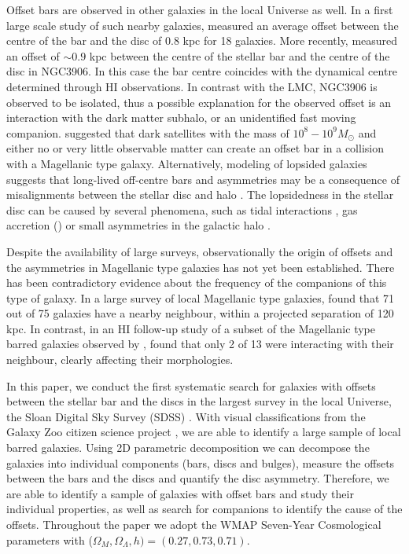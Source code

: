 \documentclass[a4paper,fleqn,usenatbib,useAMS]{mnras}
\begin{document}
Offset bars are observed in other galaxies in the local Universe as well. In a first large scale study of such nearby galaxies, \citet{Feitzinger1980} measured an average offset between the centre of the bar and the disc of $0.8$ kpc for 18 galaxies. More recently, \citet{Swardt2015} measured an offset of $\sim$$0.9$ kpc between the centre of the stellar bar and the centre of the disc in NGC3906. In this case the bar centre coincides with the dynamical centre determined through HI observations. In contrast with the LMC, NGC3906 is observed to be isolated, thus a possible explanation for the observed offset is an interaction with the dark matter subhalo, or an unidentified fast moving companion.  \citet{Bekki2009} suggested that dark satellites with the mass of $10^{8}-10^{9} M_{\odot}$ and either no or very little observable matter can create an offset bar in a collision with a Magellanic type galaxy. Alternatively, modeling of lopsided galaxies suggests that long-lived off-centre bars and asymmetries may be a consequence of misalignments between the stellar disc and halo \citep{Jog1997,levine1998,Noordermeer2001}. The lopsidedness in the stellar disc can be caused by several phenomena, such as tidal interactions \citep{Bale1969}, gas accretion (\citet{Zaritsky1997, Bournaud2005}) or small asymmetries in the galactic halo \citep{Jog2009}.

Despite the availability of large surveys, observationally the origin of offsets and the asymmetries in Magellanic type galaxies has not yet been established. There has been contradictory evidence about the frequency of the companions of this type of galaxy. In a large survey of local Magellanic type galaxies, \citet{Odewahn1994} found that 71 out of 75 galaxies have a nearby neighbour, within a projected separation of 120 kpc. In contrast, in an HI follow-up study of a subset of the Magellanic type barred galaxies observed by \citet{Odewahn1994}, \citet{Wilcots2004} found that only 2 of 13  were interacting with their neighbour, clearly affecting their morphologies.

In this paper, we conduct the first systematic search for galaxies with offsets between the stellar bar and the discs in the largest survey in the local Universe, the Sloan Digital Sky Survey (SDSS) \citep{York2000}. With visual classifications from the Galaxy Zoo citizen science project \citep{Lintott2008, Willett2013}, we are able to identify a large sample of local barred galaxies. Using 2D parametric decomposition we can decompose the galaxies into individual components (bars, discs and bulges), measure the offsets between the bars and the discs and quantify the disc asymmetry. Therefore, we are able to identify a sample of galaxies with offset bars and study their individual properties, as well as search for companions to identify the cause of the offsets. Throughout the paper we adopt the WMAP Seven-Year Cosmological parameters \citep{Jarosik2011} with ($\Omega_{M},\Omega_{\Lambda},h) = (0.27,0.73,0.71)$.
\end{document}
